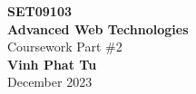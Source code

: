\begin{titlepage}
    \pagebreak
    \hspace{0pt}
    \vfill
    \begin{center}
    {\fontsize{30}{48}\selectfont \bfseries SET09103}
        \\\vspace{10pt}
        {\fontsize{30}{48}\selectfont \bfseries Advanced Web Technologies}
        \\\vspace{20pt}
        {\LARGE Coursework Part \#2} \\
        \vspace{20pt}
        \textbf{Vinh Phat Tu }
        \vspace{8pt}
        \\ December 2023
    \end{center}
    \vfill
    \hspace{0pt}
    \pagebreak
\end{titlepage}